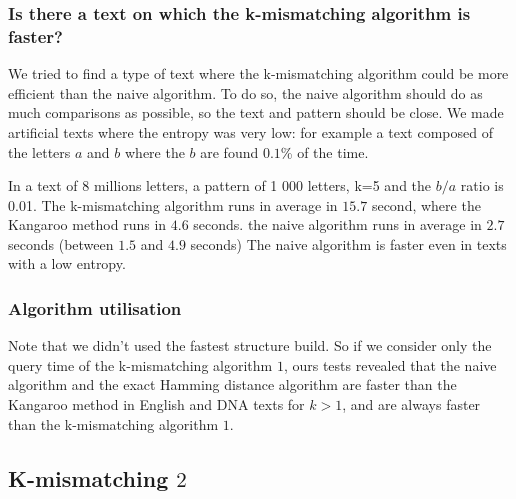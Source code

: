 \documentclass[preprint,12pt]{elsarticle}
\begin{document}
\subsubsection*{Is there a text on which the k-mismatching algorithm is faster?}

We tried to find a type of text where the k-mismatching algorithm could be more efficient than the naive algorithm.
To do so, the naive algorithm should do as much comparisons as possible,
so the text and pattern should be close.
We made artificial texts where the entropy was very low:
for example a text composed of the letters $a$ and $b$ where the $b$ are found $0.1$\% of the time.

In a text of 8 millions letters, a pattern of 1 000 letters, k=5 and the $b/a$ ratio is 0.01. %
The k-mismatching algorithm runs in average in $15.7$ second, where the Kangaroo method runs in $4.6$ seconds.
the naive algorithm runs in average in $2.7$ seconds (between $1.5$ and $4.9$ seconds)
The naive algorithm is faster even in texts with a low entropy.



\subsubsection*{Algorithm utilisation}

Note that we didn't used the fastest structure build.
So if we consider only the query time of the k-mismatching algorithm $1$,
ours tests revealed that the naive algorithm and the exact Hamming distance algorithm
are faster than the Kangaroo method in English and DNA texts for $k > 1$,
and are always faster than the k-mismatching algorithm $1$. 






\subsection{K-mismatching $2$}


\end{document}
